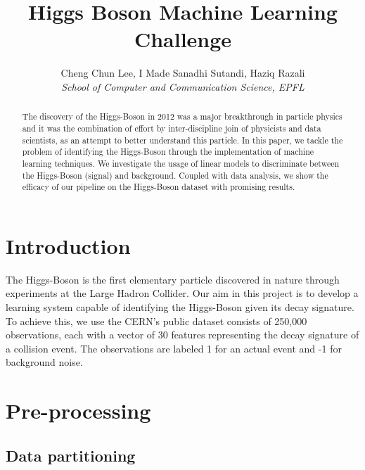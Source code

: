 \documentclass[10pt,conference,compsocconf]{IEEEtran}
\begin{document}
\title{Higgs Boson Machine Learning Challenge}

\author{
  Cheng Chun Lee, I Made Sanadhi Sutandi, Haziq Razali\\
  \textit{School of Computer and Communication Science, EPFL}
}

\maketitle

\begin{abstract}
  The discovery of the Higgs-Boson in 2012 was a major breakthrough in particle physics and it was the combination of effort by inter-discipline join of physicists and data scientists, as an attempt to better understand this particle. In this paper, we tackle the problem of identifying the Higgs-Boson through the implementation of machine learning techniques. We investigate the usage of linear models to discriminate between the Higgs-Boson (signal) and background. Coupled with data analysis, we show the efficacy of our pipeline on the Higgs-Boson dataset with promising results.
\end{abstract}

\section{Introduction}

The Higgs-Boson is the first elementary particle discovered in nature through experiments at the Large Hadron Collider. Our aim in this project is to develop a learning system capable of identifying the Higgs-Boson given its decay signature. To achieve this, we use the CERN's public dataset consists of 250,000 observations, each with a vector of 30 features representing  the decay signature of a collision event. The observations are labeled 1 for an actual event and -1 for background noise.

\section{Pre-processing} 

\subsection{Data partitioning}
\end{document}
